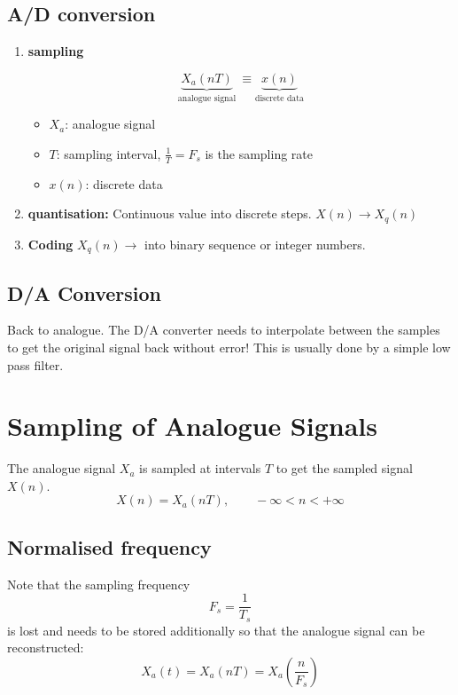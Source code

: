 \documentclass[12pt,a4paper]{article}
\begin{document}
\subsection{A/D conversion}

\begin{enumerate}

\item {\bf sampling}

\begin{equation}
\underbrace{X_{a}(nT)}_{\mbox{analogue signal}}~ \equiv \underbrace{x(n)}_{\mbox{discrete data}}
\end{equation}

\begin{itemize}
\item $X_a$: analogue signal
\item $T$: sampling interval, $\frac{1}{T}=F_s$ is the sampling rate
\item $x(n)$: discrete data
\end{itemize}

\item {\bf quantisation:} 
Continuous value into discrete steps. $X(n) \rightarrow X_{q}(n)$

\item {\bf Coding}
$X_{q}(n) \rightarrow$  into binary sequence or integer numbers.
\end{enumerate}


\subsection{D/A Conversion}
Back to analogue. The D/A converter needs to interpolate between the samples
to get the original signal back without error! This is usually
done by a simple low pass filter.




\section{Sampling of Analogue Signals}
The analogue signal $X_a$ is sampled at intervals $T$ to get
the sampled signal $X(n)$.
\begin{equation}
X(n) = X_{a}(nT),  \qquad -\infty < n < +\infty
\end{equation}

\subsection{Normalised frequency}
Note that the sampling frequency
\begin{equation}
F_{s} = \frac{1}{T_s}
\end{equation}
is lost and needs to be stored additionally so that the analogue
signal can be reconstructed:
\begin{equation}
X_{a}(t) = X_{a}(nT) = X_{a}(\frac{n}{F_{s}})
\end{equation}
\end{document}
